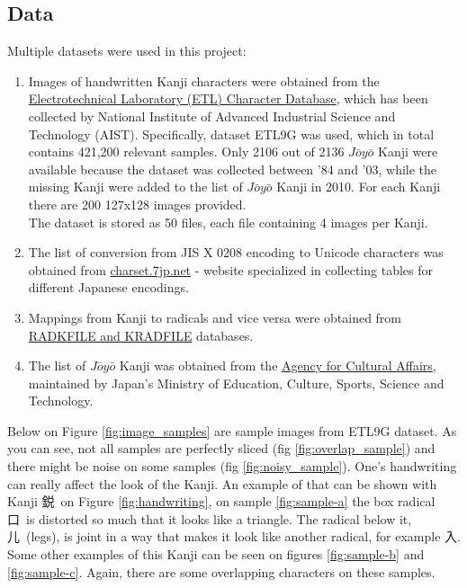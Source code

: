 \documentclass{article}
\begin{document}
\begin{CJK*}{UTF8}{min}
\section{Data}
Multiple datasets were used in this project:
\begin{enumerate}
    \item
        Images of handwritten Kanji characters were obtained from the \href{http://etlcdb.db.aist.go.jp/}{Electrotechnical Laboratory (ETL) Character Database}, which has been collected by National Institute of Advanced Industrial Science and Technology (AIST). Specifically, dataset ETL9G was used, which in total contains 421,200 relevant samples. Only 2106 out of 2136 $J\bar{o}y\bar{o}$ Kanji were available because the dataset was collected between '84 and '03, while the missing Kanji were added to the list of $J\bar{o}y\bar{o}$ Kanji in 2010. For each Kanji there are 200 127x128 images provided. \\
        The dataset is stored as 50 files, each file containing 4 images per Kanji.

    \item
        The list of conversion from JIS X 0208 encoding to Unicode characters was obtained from  \href{http://charset.7jp.net/jis0208.html}{charset.7jp.net} - website specialized in collecting tables for different Japanese encodings.
    \item
        Mappings from Kanji to radicals and vice versa were obtained from \href{http://www.Kanjicafe.com/kradfile_license.htm}{RADKFILE and KRADFILE} databases.
    \item
        The list of $J\bar{o}y\bar{o}$ Kanji was obtained from the \href{http://www.bunka.go.jp/kokugo_nihongo/sisaku/joho/joho/kijun/naikaku/pdf/joyoKanjihyo_20101130.pdf}{Agency for Cultural Affairs}, maintained by Japan's Ministry of Education, Culture, Sports, Science and Technology.
\end{enumerate}
Below on Figure \ref{fig:image_samples} are sample images from ETL9G dataset. As you can see, not all samples are perfectly sliced (fig \ref{fig:overlap_sample}) and there might be noise on some samples (fig \ref{fig:noisy_sample}). One's handwriting can really affect the look of the Kanji. An example of that can be shown with Kanji 鋭\ on Figure \ref{fig:handwriting}, on sample \ref{fig:sample-a} the box radical 口\ is distorted so much that it looks like a triangle. The radical below it, 儿\ (legs), is joint in a way that makes it look like another radical, for example 入. Some other examples of this Kanji can be seen on figures \ref{fig:sample-b} and \ref{fig:sample-c}. Again, there are some overlapping characters on these samples.


\end{CJK*}
\end{document}
